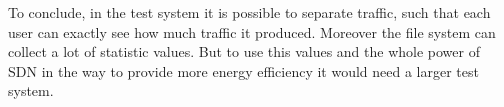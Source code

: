 To conclude, in the test system it is possible to separate traffic, such that each user can exactly see how much traffic it produced. Moreover the file system can collect a lot of statistic values. But to use this values and the whole power of SDN in the way to provide more energy efficiency it would need a larger test system.  
